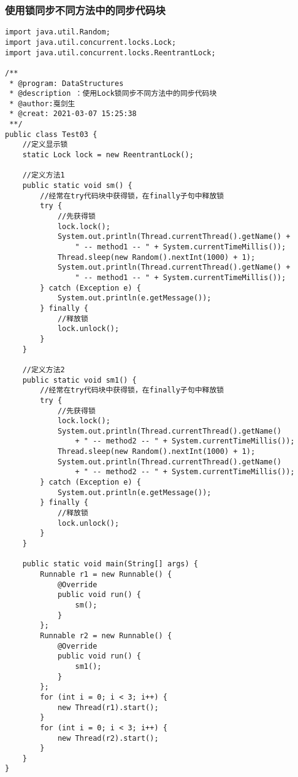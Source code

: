 \documentclass[a4paper]{report}
\begin{document}
\subsubsection{使用锁同步不同方法中的同步代码块}

\begin{Verbatim}[frame=single,numbersep=5pt,xleftmargin=1.5em,xrightmargin=1.5em]
import java.util.Random;
import java.util.concurrent.locks.Lock;
import java.util.concurrent.locks.ReentrantLock;

/**
 * @program: DataStructures
 * @description ：使用Lock锁同步不同方法中的同步代码块
 * @author:戛剑生
 * @creat: 2021-03-07 15:25:38
 **/
public class Test03 {
    //定义显示锁
    static Lock lock = new ReentrantLock();

    //定义方法1
    public static void sm() {
        //经常在try代码块中获得锁，在finally子句中释放锁
        try {
            //先获得锁
            lock.lock();
            System.out.println(Thread.currentThread().getName() +
                " -- method1 -- " + System.currentTimeMillis());
            Thread.sleep(new Random().nextInt(1000) + 1);
            System.out.println(Thread.currentThread().getName() +
                " -- method1 -- " + System.currentTimeMillis());
        } catch (Exception e) {
            System.out.println(e.getMessage());
        } finally {
            //释放锁
            lock.unlock();
        }
    }

    //定义方法2
    public static void sm1() {
        //经常在try代码块中获得锁，在finally子句中释放锁
        try {
            //先获得锁
            lock.lock();
            System.out.println(Thread.currentThread().getName()
                + " -- method2 -- " + System.currentTimeMillis());
            Thread.sleep(new Random().nextInt(1000) + 1);
            System.out.println(Thread.currentThread().getName()
                + " -- method2 -- " + System.currentTimeMillis());
        } catch (Exception e) {
            System.out.println(e.getMessage());
        } finally {
            //释放锁
            lock.unlock();
        }
    }

    public static void main(String[] args) {
        Runnable r1 = new Runnable() {
            @Override
            public void run() {
                sm();
            }
        };
        Runnable r2 = new Runnable() {
            @Override
            public void run() {
                sm1();
            }
        };
        for (int i = 0; i < 3; i++) {
            new Thread(r1).start();
        }
        for (int i = 0; i < 3; i++) {
            new Thread(r2).start();
        }
    }
}
\end{Verbatim}
\end{document}
